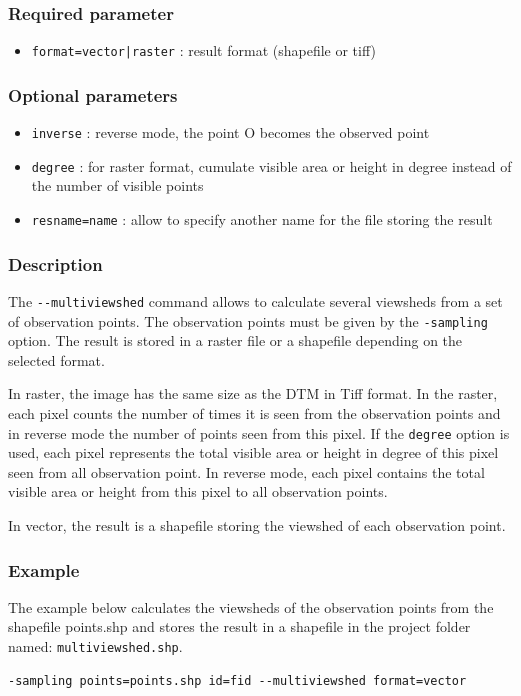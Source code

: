 \documentclass{report}
\begin{document}
\subsubsection{Required parameter}
\begin{itemize}
	\item \verb/format=vector|raster/ : result format (shapefile or tiff)
\end{itemize}

\subsubsection{Optional parameters}
\begin{itemize}
	\item \verb|inverse| : reverse mode, the point O becomes the observed point
	\item \verb|degree| : for raster format, cumulate visible area or height in degree instead of the number of visible points
	\item \verb|resname=name| : allow to specify another name for the file storing the result
\end{itemize}

\subsubsection{Description}
The \verb|--multiviewshed| command allows to calculate several viewsheds from a set of observation points. The observation points must be given by the \verb|-sampling| option. 
The result is stored in a raster file or a shapefile depending on the selected format.

In raster, the image has the same size as the DTM in Tiff format. In the raster, each pixel counts the number of times it is seen from the observation points and in reverse mode the number of points seen from this pixel. If the \verb|degree| option is used, each pixel represents the total visible area or height in degree of this pixel seen from all observation point. In reverse mode, each pixel contains the total visible area or height from this pixel to all observation points.

In vector, the result is a shapefile storing the viewshed of each observation point.

\subsubsection{Example}
The example below calculates the viewsheds of the observation points from the shapefile points.shp and stores the result in a shapefile in the project folder named: \verb|multiviewshed.shp|.
\begin{Verbatim}
-sampling points=points.shp id=fid --multiviewshed format=vector
\end{Verbatim}
\end{document}
